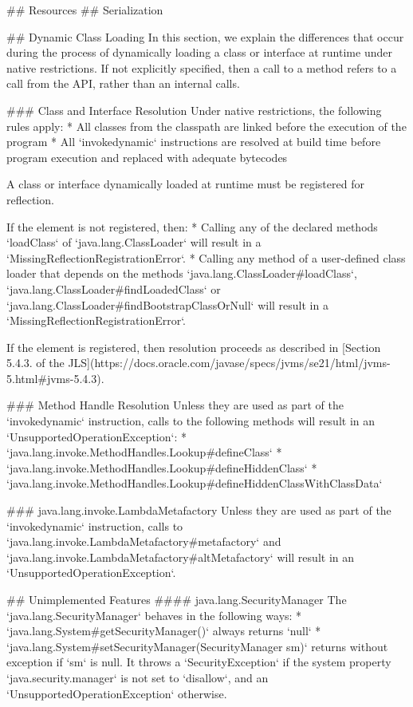 ## Resources
## Serialization

## Dynamic Class Loading
In this section, we explain the differences that occur during the process of dynamically loading
a class or interface at runtime under native restrictions. 
If not explicitly specified, then a call to a method refers to a call from the API, 
rather than an internal calls.

### Class and Interface Resolution
Under native restrictions, the following rules apply: 
* All classes from the classpath are linked before the execution of the program
* All `invokedynamic` instructions are resolved at build time before program execution and replaced
  with adequate bytecodes

A class or interface dynamically loaded at runtime must be registered for reflection.

If the element is not registered, then:
* Calling any of the declared methods `loadClass` of `java.lang.ClassLoader` will result in a 
`MissingReflectionRegistrationError`.
* Calling any method of a user-defined class loader that depends on the methods `java.lang.ClassLoader#loadClass`, 
`java.lang.ClassLoader#findLoadedClass` or `java.lang.ClassLoader#findBootstrapClassOrNull` 
will result in a `MissingReflectionRegistrationError`.

If the element is registered, then resolution proceeds as described in 
[Section 5.4.3. of the JLS](https://docs.oracle.com/javase/specs/jvms/se21/html/jvms-5.html#jvms-5.4.3).

### Method Handle Resolution
Unless they are used as part of the `invokedynamic` instruction, calls to the following methods 
will result in an `UnsupportedOperationException`:
* `java.lang.invoke.MethodHandles.Lookup#defineClass`
* `java.lang.invoke.MethodHandles.Lookup#defineHiddenClass`
* `java.lang.invoke.MethodHandles.Lookup#defineHiddenClassWithClassData`

### java.lang.invoke.LambdaMetafactory
Unless they are used as part of the `invokedynamic` instruction, calls to `java.lang.invoke.LambdaMetafactory#metafactory` 
and `java.lang.invoke.LambdaMetafactory#altMetafactory` will result in an `UnsupportedOperationException`.


## Unimplemented Features
#### java.lang.SecurityManager
The `java.lang.SecurityManager` behaves in the following ways:
* `java.lang.System#getSecurityManager()` always returns `null`
* `java.lang.System#setSecurityManager(SecurityManager sm)` returns without exception if `sm` is null. 
It throws a `SecurityException` if the system property `java.security.manager` is not set to `disallow`, and an 
`UnsupportedOperationException` otherwise.





